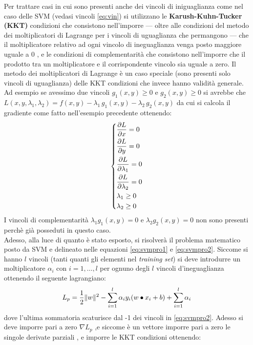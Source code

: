 Per trattare casi in cui sono presenti anche dei vincoli di iniguaglianza come nel caso delle \ac{SVM} (vedasi vincoli \eqref{eq:vin}) si utilizzano le \textbf{Karush-Kuhn-Tucker (KKT)} condizioni che consistono nell'imporre --- oltre alle condizioni del metodo dei moltiplicatori di Lagrange per i vincoli di uguaglianza che permangono --- che il moltiplicatore relativo ad ogni vincolo di ineguaglianza venga posto maggiore uguale a 0 , e le condizioni di complementarità che consistono nell'imporre che il prodotto tra un moltiplicatore e il corrispondente vincolo sia uguale a zero. Il metodo dei moltiplicatori di Lagrange  è un caso speciale (sono presenti solo vincoli di uguaglianza) delle KKT condizioni che invece hanno validità generale.
Ad esempio se avessimo due vincoli $g_{1}(x,y) \geq 0 \text{ e } g_{2}(x,y) \geq 0$ si avrebbe che $L(x,y,\lambda_{1},\lambda_{2}) = f(x,y) - \lambda_{1}\,g_{1}(x,y) - \lambda_{2}\,g_{2}(x,y)$ da cui si calcola il gradiente come fatto nell'esempio precedente ottenendo:
\[
\begin{dcases}
\frac{\partial L}{\partial x} = 0 \\
\frac{\partial L}{\partial y} = 0 \\
\frac{\partial L}{\partial \lambda_{1}} = 0 \\
\frac{\partial L}{\partial \lambda_{2}} = 0 \\
\lambda_{1} \geq 0 \\
\lambda_{2} \geq 0
\end{dcases}
\]
I vincoli di complementarità $\lambda_{1}g_{1}(x,y) = 0$ e $\lambda_{2}g_{2}(x,y) = 0$ non sono presenti perchè già posseduti in questo caso.\\
Adesso, alla luce di quanto è stato esposto, si risolverà il problema matematico posto da \ac{SVM} e delineato nelle equazioni \eqref{eq:svmpro1} e \eqref{eq:svmpro2}. Siccome si hanno $l$ vincoli (tanti quanti gli elementi nel \textit{training set}) si deve introdurre un moltiplicatore $\alpha_{i} \text{ con } i=1,\dots,l$ per ognuno degli $l$ vincoli d'ineguaglianza ottenendo il seguente lagrangiano:
\begin{equation}
\label{eq:pri}
L_{p} = \frac{1}{2}\lVert w\rVert^{2} - \sum_{i=1}^{l}\alpha_{i}y_{i}(w \bullet x_{i} + b) + \sum_{i=1}^{l}\alpha_{i}
\end{equation}
dove l'ultima sommatoria scaturisce dal -1 dei vincoli in \eqref{eq:svmpro2}.
Adesso si deve imporre pari a zero $\nabla L_{p}$ ,e siccome è un vettore imporre pari a zero le singole derivate parziali , e imporre le KKT condizioni ottenendo:

